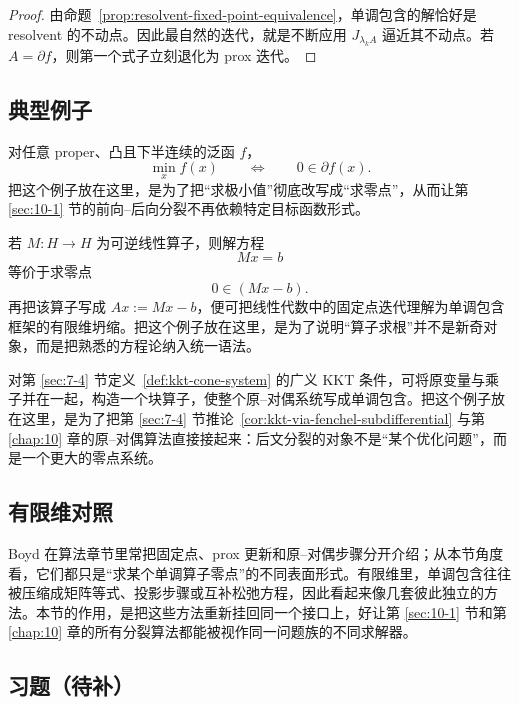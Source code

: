 \begin{proof}
由命题~\ref{prop:resolvent-fixed-point-equivalence}，单调包含的解恰好是 resolvent 的不动点。因此最自然的迭代，就是不断应用 $J_{\lambda_k A}$ 逼近其不动点。若 $A=\partial f$，则第一个式子立刻退化为 prox 迭代。
\end{proof}

\subsection{典型例子}

\begin{example}[极小化问题的零点表达]
对任意 proper、凸且下半连续的泛函 $f$，
\[
\min_x f(x)
\qquad\Longleftrightarrow\qquad
0\in \partial f(x).
\]
把这个例子放在这里，是为了把“求极小值”彻底改写成“求零点”，从而让第 \ref{sec:10-1} 节的前向--后向分裂不再依赖特定目标函数形式。
\end{example}

\begin{example}[线性方程组的固定点坍缩]
若 $M\colon H\to H$ 为可逆线性算子，则解方程
\[
Mx=b
\]
等价于求零点
\[
0\in (Mx-b).
\]
再把该算子写成 $A x:=Mx-b$，便可把线性代数中的固定点迭代理解为单调包含框架的有限维坍缩。把这个例子放在这里，是为了说明“算子求根”并不是新奇对象，而是把熟悉的方程论纳入统一语法。
\end{example}

\begin{example}
对第 \ref{sec:7-4} 节定义~\ref{def:kkt-cone-system} 的广义 KKT 条件，可将原变量与乘子并在一起，构造一个块算子，使整个原--对偶系统写成单调包含。把这个例子放在这里，是为了把第 \ref{sec:7-4} 节推论~\ref{cor:kkt-via-fenchel-subdifferential} 与第 \ref{chap:10} 章的原--对偶算法直接接起来：后文分裂的对象不是“某个优化问题”，而是一个更大的零点系统。
\end{example}

\subsection*{有限维对照}

Boyd 在算法章节里常把固定点、prox 更新和原--对偶步骤分开介绍；从本节角度看，它们都只是“求某个单调算子零点”的不同表面形式。有限维里，单调包含往往被压缩成矩阵等式、投影步骤或互补松弛方程，因此看起来像几套彼此独立的方法。本节的作用，是把这些方法重新挂回同一个接口上，好让第 \ref{sec:10-1} 节和第 \ref{chap:10} 章的所有分裂算法都能被视作同一问题族的不同求解器。

\subsection*{习题（待补）}

